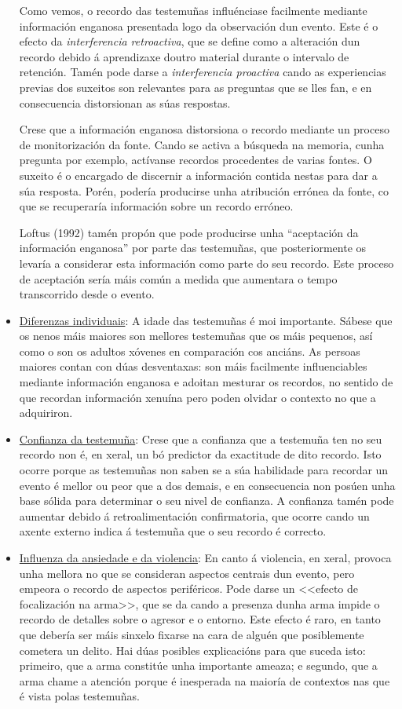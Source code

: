 \documentclass[a4paper,11pt]{article}
\begin{document}
\begin{itemize}
	Como vemos, o recordo das testemuñas influénciase facilmente mediante información enganosa 
	presentada logo da observación dun evento. Este é o efecto da \textit{interferencia 
	retroactiva}, que se define como a alteración dun recordo debido á aprendizaxe doutro material 
	durante o intervalo de retención. Tamén pode darse a \textit{interferencia proactiva} cando as 
	experiencias previas dos suxeitos son relevantes para as preguntas que se lles fan, e en 
	consecuencia distorsionan as súas respostas.
	
	Crese que a información enganosa distorsiona o recordo mediante un proceso de monitorización da
	fonte. Cando se activa a búsqueda na memoria, cunha pregunta por exemplo, actívanse recordos
	procedentes de varias fontes. O suxeito é o encargado de discernir a información contida nestas
	para dar a súa resposta. Porén, podería producirse unha atribución errónea da fonte, co que se
	recuperaría información sobre un recordo erróneo.
	
	Loftus (1992) tamén propón que pode producirse unha ``aceptación da información enganosa'' por
	parte das testemuñas, que posteriormente os levaría a considerar esta información como parte do 
	seu recordo. Este proceso de aceptación sería máis común a medida que aumentara o tempo 
	transcorrido desde o evento.
	
	\item \underline{Diferenzas individuais}: A idade das testemuñas é moi importante. Sábese que os
	nenos máis maiores son mellores testemuñas que os máis pequenos, así como o son os adultos 
	xóvenes en comparación cos anciáns. As persoas maiores contan con dúas desventaxas: son máis 
	facilmente influenciables mediante información enganosa e adoitan mesturar os recordos, no 
	sentido de que recordan información xenuína pero poden olvidar o contexto no que a adquiriron.
	
	\item \underline{Confianza da testemuña}: Crese que a confianza que a testemuña ten no seu 
	recordo non é, en xeral, un bó predictor da exactitude de dito recordo. Isto ocorre porque as 
	testemuñas non saben se a súa habilidade para recordar un evento é mellor ou peor que a dos 
	demais, e en consecuencia non posúen unha base sólida para determinar o seu nivel de confianza. 
	A confianza tamén pode aumentar debido á retroalimentación confirmatoria, que ocorre cando un 
	axente externo indica á testemuña que o seu recordo é correcto.
	
	\item \underline{Influenza da ansiedade e da violencia}: En canto á violencia, en xeral, provoca
	unha mellora no que se consideran aspectos centrais dun evento, pero empeora o recordo de
	aspectos periféricos. Pode darse un <<efecto de focalización na arma>>, que se da cando a
	presenza dunha arma impide o recordo de detalles sobre o agresor e o entorno. Este efecto é 
	raro, en tanto que debería ser máis sinxelo fixarse na cara de alguén que posiblemente cometera 
	un delito. Hai dúas posibles explicacións para que suceda isto: primeiro, que a arma constitúe 
	unha importante ameaza; e segundo, que a arma chame a atención porque é inesperada na maioría de 
	contextos nas que é vista polas testemuñas.
	

\end{itemize}
\end{document}
